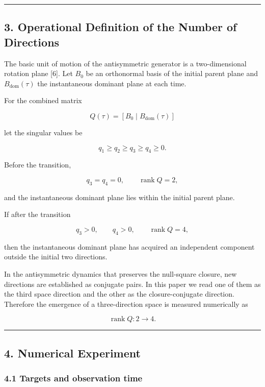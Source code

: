 \documentclass[
  a4paper,
]{article}
\begin{document}
\begin{center}\rule{0.5\linewidth}{0.5pt}\end{center}

\subsection{3. Operational Definition of the Number of
Directions}\label{operational-definition-of-the-number-of-directions}

The basic unit of motion of the antisymmetric generator is a
two-dimensional rotation plane {[}6{]}. Let \(B_0\) be an orthonormal
basis of the initial parent plane and \(B_{\mathrm{dom}}(\tau)\) the
instantaneous dominant plane at each time.

For the combined matrix

\[
Q(\tau)=[B_0\mid B_{\mathrm{dom}}(\tau)]
\]

let the singular values be

\[
q_1\ge q_2\ge q_3\ge q_4\ge0 .
\]

Before the transition,

\[
q_3=q_4=0,
\qquad
\operatorname{rank}Q=2,
\]

and the instantaneous dominant plane lies within the initial parent
plane.

If after the transition

\[
q_3>0,
\qquad
q_4>0,
\qquad
\operatorname{rank}Q=4,
\]

then the instantaneous dominant plane has acquired an independent
component outside the initial two directions.

In the antisymmetric dynamics that preserves the null-square closure,
new directions are established as conjugate pairs. In this paper we read
one of them as the third space direction and the other as the
closure-conjugate direction. Therefore the emergence of a
three-direction space is measured numerically as

\[
\boxed{
\operatorname{rank}Q:2\longrightarrow4 } .
\]

\begin{center}\rule{0.5\linewidth}{0.5pt}\end{center}

\subsection{4. Numerical Experiment}\label{numerical-experiment}

\subsubsection{4.1 Targets and observation
time}\label{targets-and-observation-time}
\end{document}
